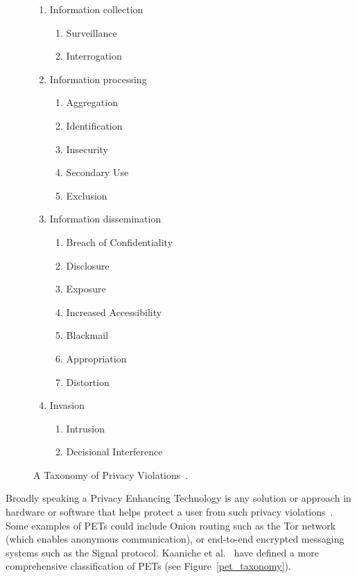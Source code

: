 \documentclass[
    author={Jacob Daniel Halsey},
    supervisor={Prof. Awais Rashid},
    degree={BSc},
    title={Building a Testbed for Evaluating Privacy Enhancing Technologies  (PETs)},
    subtitle={},
    type={software development},
    year={2021}
]{dissertation}
\begin{document}
\begin{figure}
	\centering
	\parbox{7cm}{
		\begin{enumerate}
			\item Information collection
			\begin{enumerate}
				\item Surveillance
				\item Interrogation 
			\end{enumerate}
			\item Information processing
			\begin{enumerate}
				\item Aggregation
				\item Identification
				\item Insecurity
				\item Secondary Use
				\item Exclusion
			\end{enumerate}
		\end{enumerate}
	}
	\qquad
	\begin{minipage}{7cm}
		\begin{enumerate}
			\setcounter{enumi}{2}
			\item Information  dissemination
			\begin{enumerate}
				\item Breach of Confidentiality
				\item Disclosure
				\item Exposure
				\item Increased Accessibility
				\item Blackmail
				\item Appropriation
				\item Distortion
			\end{enumerate}
			\item Invasion
			\begin{enumerate}
				\item Intrusion
				\item Decisional Interference
			\end{enumerate} 
		\end{enumerate}
	\end{minipage}
	\caption{A Taxonomy of Privacy Violations~\cite{solove_privacy}.}
	\label{privacy_taxonomy}
\end{figure}

Broadly speaking a Privacy Enhancing Technology is any solution or approach in hardware or software that helps
protect a user from such privacy violations~\cite{buckley_pets}. Some examples of PETs could include 
Onion routing such as the Tor network (which enables anonymous communication), or
end-to-end encrypted messaging systems such as the Signal protocol. 
Kaaniche et al.~\cite{kaaniche_2020_privacy} have defined a more comprehensive classification of PETs
(see Figure~\ref{pet_taxonomy}).
\end{document}
